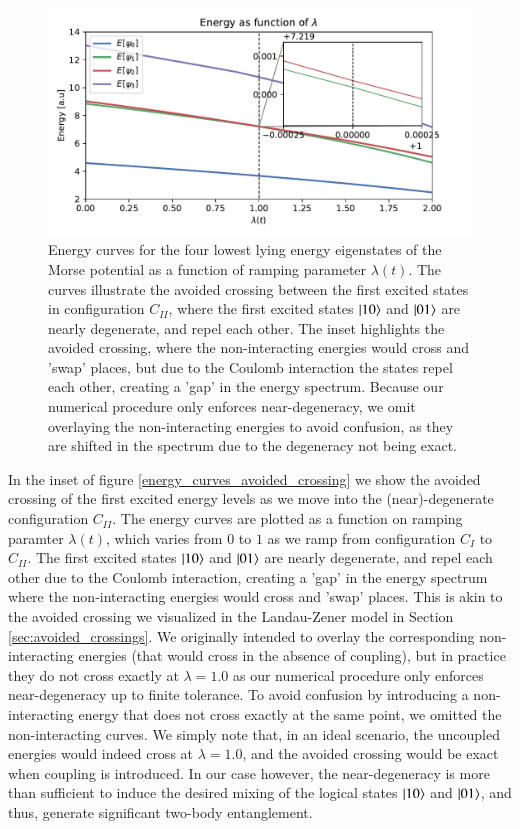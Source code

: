 \documentclass{subfiles}
\begin{document}
\begin{figure}[h!]
  \centering
  \includegraphics[width=1.0\textwidth]{figs/energy_curves_avoided_crossing.pdf}
  \caption{Energy curves for the four lowest lying energy eigenstates of the Morse potential as a function of ramping parameter $\lambda(t)$. The curves illustrate the avoided crossing between the first excited states in configuration $C_{II}$, where the first excited states $\ket{10}$ and $\ket{01}$ are nearly degenerate, and repel each other. The inset highlights the avoided crossing, where the non-interacting energies would cross and 'swap' places, but due to the Coulomb interaction the states repel each other, creating a 'gap' in the energy spectrum. Because our numerical procedure only enforces near-degeneracy, we omit overlaying the non-interacting energies to avoid confusion, as they are shifted in the spectrum due to the degeneracy not being exact. }
  \label{fig:energy_curves_avoided_crossing}
\end{figure}
In the inset of figure \ref{energy_curves_avoided_crossing} we show the avoided crossing of the first excited energy levels as we move into the (near)-degenerate configuration $C_{II}$. The energy curves are plotted as a function on ramping paramter $\lambda(t)$, which varies from $0$ to $1$ as we ramp from configuration $C_I$ to $C_{II}$. The first excited states $\ket{10}$ and $\ket{01}$ are nearly degenerate, and repel each other due to the Coulomb interaction, creating a 'gap' in the energy spectrum where the non-interacting energies would cross and 'swap' places. This is akin to the avoided crossing we visualized in the Landau-Zener model in Section \ref{sec:avoided_crossings}. We originally intended to overlay the corresponding non-interacting energies (that would cross in the absence of coupling), but in practice they do not cross exactly at $\lambda = 1.0$ as our numerical procedure only enforces near-degeneracy up to finite tolerance. To avoid confusion by introducing a non-interacting energy that does not cross exactly at the same point, we omitted the non-interacting curves. We simply note that, in an ideal scenario, the uncoupled energies would indeed cross at $\lambda = 1.0$, and the avoided crossing would be exact when coupling is introduced. In our case however, the near-degeneracy is more than sufficient to induce the desired mixing of the logical states $\ket{10}$ and $\ket{01}$, and thus, generate significant two-body entanglement.
\\
\end{document}
